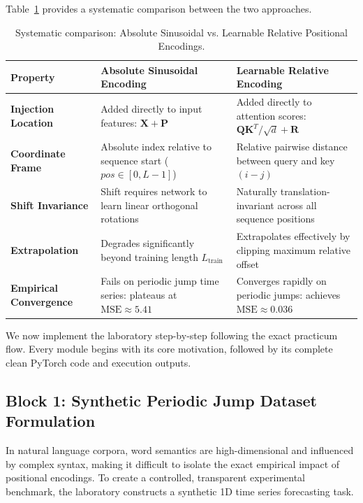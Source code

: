 \documentclass[11pt,a4paper]{article}
\begin{document}
Table~\ref{tab:positional_encoding_comparison} provides a systematic comparison between the two approaches.

\begin{table}[htbp]
\centering
\small
\begin{tabularx}{\textwidth}{lXX}
\toprule
\textbf{Property} & \textbf{Absolute Sinusoidal Encoding} & \textbf{Learnable Relative Encoding} \\
\midrule
\textbf{Injection Location} & Added directly to input features: $\mathbf{X} + \mathbf{P}$ & Added directly to attention scores: $\mathbf{Q}\mathbf{K}^T/\sqrt{d} + \mathbf{R}$ \\
\textbf{Coordinate Frame} & Absolute index relative to sequence start ($pos \in [0, L-1]$) & Relative pairwise distance between query and key $(i - j)$ \\
\textbf{Shift Invariance} & Shift requires network to learn linear orthogonal rotations & Naturally translation-invariant across all sequence positions \\
\textbf{Extrapolation} & Degrades significantly beyond training length $L_{\text{train}}$ & Extrapolates effectively by clipping maximum relative offset \\
\textbf{Empirical Convergence} & Fails on periodic jump time series: plateaus at $\text{MSE} \approx 5.41$ & Converges rapidly on periodic jumps: achieves $\text{MSE} \approx 0.036$ \\
\bottomrule
\end{tabularx}
\caption{Systematic comparison: Absolute Sinusoidal vs. Learnable Relative Positional Encodings.}
\label{tab:positional_encoding_comparison}
\end{table}

We now implement the laboratory step-by-step following the exact practicum flow. Every module begins with its core motivation, followed by its complete clean PyTorch code and execution outputs.

\subsection{Block 1: Synthetic Periodic Jump Dataset Formulation}

In natural language corpora, word semantics are high-dimensional and influenced by complex syntax, making it difficult to isolate the exact empirical impact of positional encodings. To create a controlled, transparent experimental benchmark, the laboratory constructs a synthetic 1D time series forecasting task. 
\end{document}

